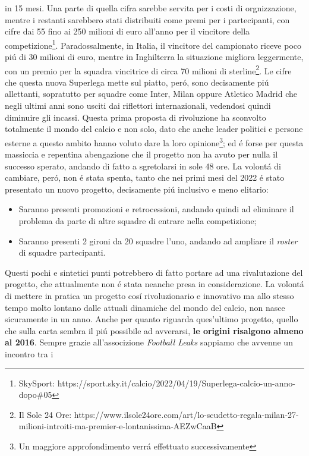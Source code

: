 \documentclass[
    corpo=12pt,
    oneside,
    evenboxes,
    tipotesi=triennale,
    stile=classica,
    oldstyle,
    autoretitolo,
    greek,
]{toptesi}
\begin{document}
\begin{interlinea}{1.5}
in 15 mesi. Una parte di quella cifra sarebbe servita per i costi di orgnizzazione, mentre i restanti sarebbero stati distribuiti come premi per i partecipanti,
con cifre dai 55 fino ai 250 milioni di euro all'anno per il vincitore della competizione\footnote{SkySport: https://sport.sky.it/calcio/2022/04/19/Superlega-calcio-un-anno-dopo\#05}. 
Paradossalmente, in Italia, il vincitore del campionato riceve poco pi\'u di 30 milioni di euro, mentre in Inghilterra la situazione migliora 
leggermente, con un premio per la squadra vincitrice di circa 70 milioni di sterline\footnote{Il Sole 24 Ore: https://www.ilsole24ore.com/art/lo-scudetto-regala-milan-27-milioni-introiti-ma-premier-e-lontanissima-AEZwCaaB}. 
Le cifre che questa nuova Superlega mette sul piatto, per\'o, sono decisamente pi\'u allettanti, sopratutto per squadre come Inter, 
Milan oppure Atletico Madrid che negli ultimi anni sono usciti dai riflettori internazionali, vedendosi quindi diminuire gli incassi.\newline
Questa prima proposta di rivoluzione ha sconvolto totalmente il mondo del calcio e non solo, dato che anche leader politici e persone esterne
a questo ambito hanno voluto dare la loro opinione\footnote{Un maggiore approfondimento verr\'a effettuato successivamente}; ed \'e forse per 
questa massiccia e repentina abengazione che il progetto non ha avuto per nulla il successo sperato, andando di fatto a sgretolarsi in sole 48 ore. La volont\'a di 
cambiare, per\'o, non \'e stata spenta, tanto che nei primi mesi del 2022 \'e stato presentato un nuovo progetto, decisamente pi\'u inclusivo e 
meno elitario:
\begin{itemize}
    \item Saranno presenti promozioni e retrocessioni, andando quindi ad eliminare il problema da parte di altre squadre di entrare nella competizione;
    \item Saranno presenti 2 gironi da 20 squadre l'uno, andando ad ampliare il \emph{roster} di squadre partecipanti.
\end{itemize} 
Questi pochi e sintetici punti potrebbero di fatto portare ad una rivalutazione del progetto, che attualmente non \'e stata neanche presa in
considerazione.\newline
La volont\'a di mettere in pratica un progetto cos\'i rivoluzionario e innovativo ma allo stesso tempo molto lontano dalle attuali dinamiche del
mondo del calcio, non nasce sicuramente in un anno. Anche per quanto riguarda ques'ultimo progetto, quello che sulla carta sembra il pi\'u
possibile ad avverarsi, \textbf{le origini risalgono almeno al 2016}. Sempre grazie all'associzione \emph{Football Leaks} sappiamo che avvenne un incontro tra i 

\end{interlinea}
\end{document}
